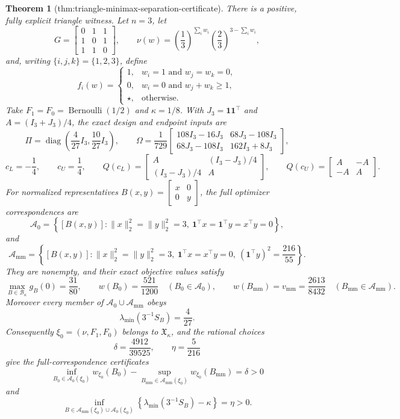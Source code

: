 \documentclass{article}
\newtheorem{theorem}{Theorem}
\begin{document}
\begin{theorem}[thm:triangle-minimax-separation-certificate]\label{thm:triangle-minimax-separation-certificate}
There is a positive, fully explicit triangle witness.  Let \(n=3\), let
\[
G=\begin{bmatrix}0&1&1\\1&0&1\\1&1&0\end{bmatrix},
\qquad
\nu(w)=\left(\frac13\right)^{\sum_iw_i}
       \left(\frac23\right)^{3-\sum_iw_i},
\]
and, writing \(\{i,j,k\}=\{1,2,3\}\), define
\[
f_i(w)=
\begin{cases}
1,&w_i=1\text{ and }w_j=w_k=0,\\
0,&w_i=0\text{ and }w_j+w_k\ge1,\\
\star,&\text{otherwise}.
\end{cases}
\]
Take \(F_1=F_0=\operatorname{Bernoulli}(1/2)\) and \(\kappa=1/8\).  With \(J_3=\mathbf 1\mathbf 1^{\top}\) and \(A=(I_3+J_3)/4\), the exact design and endpoint inputs are
\[
\Pi=\operatorname{diag}\!\left(\frac4{27}I_3,\frac{10}{27}I_3\right),
\qquad
\Omega=\frac1{729}
\begin{bmatrix}
108I_3-16J_3&68J_3-108I_3\\
68J_3-108I_3&162I_3+8J_3
\end{bmatrix},
\]
\[
c_L=-\frac14,
\qquad c_U=\frac14,
\qquad
Q(c_L)=
\begin{bmatrix}A&(I_3-J_3)/4\\(I_3-J_3)/4&A\end{bmatrix},
\qquad
Q(c_U)=
\begin{bmatrix}A&-A\\-A&A\end{bmatrix}.
\]
For normalized representatives \(B(x,y)=\begin{bmatrix}x&0\\0&y\end{bmatrix}\), the full optimizer correspondences are
\[
\mathcal A_0=
\left\{[B(x,y)]:
\lVert x\rVert_2^2=\lVert y\rVert_2^2=3,\ 
\mathbf 1^{\top}x=\mathbf 1^{\top}y=x^{\top}y=0
\right\},
\]
and
\[
\mathcal A_{\mathrm{mm}}=
\left\{[B(x,y)]:
\lVert x\rVert_2^2=\lVert y\rVert_2^2=3,\ 
\mathbf 1^{\top}x=x^{\top}y=0,\ 
(\mathbf 1^{\top}y)^2=\frac{216}{55}
\right\}.
\]
They are nonempty, and their exact objective values satisfy
\[
\max_{B\in\mathcal B_\kappa}g_B(0)=\frac{31}{80},
\qquad
w(B_0)=\frac{521}{1200}\quad(B_0\in\mathcal A_0),
\qquad
w(B_{\mathrm{mm}})=v_{\mathrm{mm}}=\frac{2613}{8432}
\quad(B_{\mathrm{mm}}\in\mathcal A_{\mathrm{mm}}).
\]
Moreover every member of \(\mathcal A_0\cup\mathcal A_{\mathrm{mm}}\) obeys
\[
\lambda_{\min}(3^{-1}S_B)=\frac4{27}.
\]
Consequently \(\xi_0=(\nu,F_1,F_0)\) belongs to \(\mathfrak X_\kappa\), and the rational choices
\[
\delta=\frac{4912}{39525},
\qquad
\eta=\frac5{216}
\]
give the full-correspondence certificates
\[
\inf_{B_0\in\mathcal A_0(\xi_0)}w_{\xi_0}(B_0)
-\sup_{B_{\mathrm{mm}}\in\mathcal A_{\mathrm{mm}}(\xi_0)}w_{\xi_0}(B_{\mathrm{mm}})
=\delta>0
\]
and
\[
\inf_{B\in\mathcal A_{\mathrm{mm}}(\xi_0)\cup\mathcal A_0(\xi_0)}
\left\{\lambda_{\min}(3^{-1}S_B)-\kappa\right\}
=\eta>0.
\]
\end{theorem}
\end{document}
